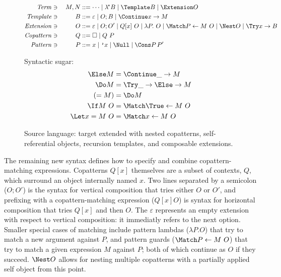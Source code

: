 \begin{figure}
\centering

\begin{alignat*}{2}
  \mathit{Term} &\ni{}& M, N
  &::= \dots
  \mid \lamstar B
  \mid \Template B
  \mid \Extension O
  \\
  \mathit{Template} &\ni{}& B
  &::= \varepsilon
  \mid O; B
  \mid \Continue x \to M
  \\
  \mathit{Extension} &\ni{}& O
  &::= \varepsilon
  \mid O; O'
  \mid Q[x] ~ O
  \mid \lambda P.~ O
  \mid \Match P \gets M ~ O
  \mid \Nest O
  \mid \Try x \to B
  \\
  \mathit{Copattern} &\ni{}& Q
  &::= \hole
  \mid Q ~ P
  \\
  \mathit{Pattern} &\ni{}& P
  &::= x
  \mid \q{x}
  \mid \Null
  \mid \Cons P \, P'
\end{alignat*}

Syntactic sugar:
\begin{align*}
  \Else M
  &=
  \Continue \_ \to M
  \\
  \Do M
  &=
  \Try \_ \to \Else \to M
  \\
  (= M)
  &=
  \Do M
  \\
  \If M ~ O
  &=
  \Match \True \gets M ~ O
  \\
  \Let x = M ~ O
  &=
  \Match x \gets M ~ O
\end{align*}
\caption{Source language: target extended with nested copatterns,
  self-referential objects, recursion templates, and composable extensions.}
\label{fig:source-syntax}
\end{figure}

The remaining new syntax defines how to specify and combine copattern-matching expressions.
Copatterns $Q[x]$ themselves are a subset of contexts, $Q$, which surround an object internally named $x$.
Two lines separated by a semicolon ($O; O'$) is the syntax for vertical composition that tries either $O$ or $O'$, and prefixing with a copattern-matching expression ($Q[x] O$) is syntax for horizontal composition that tries $Q[x]$ and then $O$.
The $\varepsilon$ represents an empty extension with respect to vertical composition: it immediatly refers to the next option.
Smaller special cases of matching include pattern lambdas ($\lambda P. O$) that try to match a new argument against $P$, and pattern guards ($\Match P \gets M ~ O$) that try to match a given expression $M$ against $P$; both of which continue as $O$ if they succeed.
$\Nest O$ allows for nesting multiple copatterns with a partially applied self object from this point.

